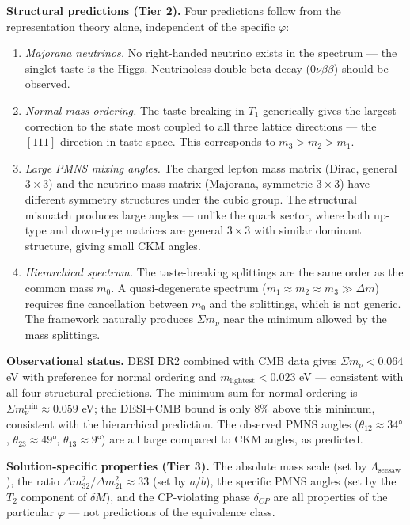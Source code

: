 \documentclass[
  11pt,
]{article}
\begin{document}
\textbf{Structural predictions (Tier 2).} Four predictions follow from
the representation theory alone, independent of the specific
\(\varphi\):

\begin{enumerate}
\def\labelenumi{(\roman{enumi})}
\item
  \emph{Majorana neutrinos.} No right-handed neutrino exists in the
  spectrum --- the singlet taste is the Higgs. Neutrinoless double beta
  decay (\(0\nu\beta\beta\)) should be observed.
\item
  \emph{Normal mass ordering.} The taste-breaking in \(T_1\) generically
  gives the largest correction to the state most coupled to all three
  lattice directions --- the \([111]\) direction in taste space. This
  corresponds to \(m_3 > m_2 > m_1\).
\item
  \emph{Large PMNS mixing angles.} The charged lepton mass matrix
  (Dirac, general \(3 \times 3\)) and the neutrino mass matrix
  (Majorana, symmetric \(3 \times 3\)) have different symmetry
  structures under the cubic group. The structural mismatch produces
  large angles --- unlike the quark sector, where both up-type and
  down-type matrices are general \(3 \times 3\) with similar dominant
  structure, giving small CKM angles.
\item
  \emph{Hierarchical spectrum.} The taste-breaking splittings are the
  same order as the common mass \(m_0\). A quasi-degenerate spectrum
  (\(m_1 \approx m_2 \approx m_3 \gg \Delta m\)) requires fine
  cancellation between \(m_0\) and the splittings, which is not generic.
  The framework naturally produces \(\Sigma m_\nu\) near the minimum
  allowed by the mass splittings.
\end{enumerate}

\textbf{Observational status.} DESI DR2 combined with CMB data gives
\(\Sigma m_\nu < 0.064\) eV with preference for normal ordering and
\(m_{\text{lightest}} < 0.023\) eV --- consistent with all four
structural predictions. The minimum sum for normal ordering is
\(\Sigma m_\nu^{\text{min}} \approx 0.059\) eV; the DESI+CMB bound is
only 8\% above this minimum, consistent with the hierarchical
prediction. The observed PMNS angles (\(\theta_{12} \approx 34°\),
\(\theta_{23} \approx 49°\), \(\theta_{13} \approx 9°\)) are all large
compared to CKM angles, as predicted.

\textbf{Solution-specific properties (Tier 3).} The absolute mass scale
(set by \(\Lambda_{\text{seesaw}}\)), the ratio
\(\Delta m^2_{32}/\Delta m^2_{21} \approx 33\) (set by \(a/b\)), the
specific PMNS angles (set by the \(T_2\) component of \(\delta M\)), and
the CP-violating phase \(\delta_{CP}\) are all properties of the
particular \(\varphi\) --- not predictions of the equivalence class.
\end{document}
